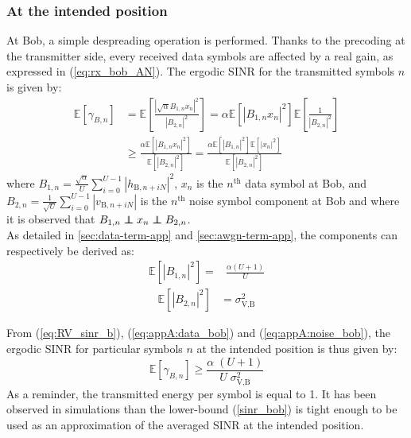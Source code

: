 \documentclass[journal,comsoc]{IEEEtran}
\newcommand{\EX}[1]{\mathbb{E} \left[#1\right]}%
\newcommand\independent{\protect\mathpalette{\protect\independenT}{\perp}}
\def\independenT#1#2{\mathrel{\rlap{$#1#2$}\mkern2mu{#1#2}}}
\begin{document}
\subsubsection{At the intended position}
At Bob, a simple despreading operation is performed. Thanks to the precoding at the transmitter side, every received data symbols are affected by a real gain, as expressed in (\ref{eq:rx_bob_AN}). The ergodic SINR for the transmitted symbols $n$ is given by:
\begin{equation}
\begin{split}
\EX{\gamma_{B,n}} &= \EX{ \frac{  \left| \sqrt{\alpha} B_{1,n} x_n \right|^2  }{  \left| B_{2,n} \right|^2} }  = \alpha \EX{\left| B_{1,n}  x_n\right|^2}  \EX{\frac{1}{\left| B_{2,n} \right|^2}}  \\
& \geq  \frac{\alpha \EX{  \left| B_{1,n}  x_n\right|^2 } }{\EX{ \left| B_{2,n} \right|^2 }} =  \frac{\alpha \EX{ \left|B_{1,n}  \right|^2 } \EX{ \left| x_n \right|^2 } }{\EX{ \left| B_{2,n} \right|^2 }}
\label{eq:RV_sinr_b}
\end{split}
\end{equation}
where $B_{1,n} = \frac{\sqrt{\alpha}}{U}\sum_{i=0}^{U-1} \left| h_{\text{B}, n + iN}\right|^2$, $x_n$ is the $n^{\text{th}}$ data symbol at Bob, and $B_{2,n} = \frac{1}{\sqrt{U}}\sum_{i=0}^{U-1} \left| v_{\text{B}, n + iN}\right|$ is the $n^{\text{th}}$ noise symbol component at Bob and where it is observed that $B_{1,n} \independent x_n \independent B_{2,n}$.\\
As detailed in \ref{sec:data-term-app} and \ref{sec:awgn-term-app}, the components can respectively be derived as:
\begin{equation}
	\begin{split}
	\EX{|B_{1,n}|^2} =& \frac{\alpha (U+1)}{U}
	\end{split}
	\label{eq:appA:data_bob}
\end{equation}
\begin{equation}
	\begin{split}
	\EX{|B_{2,n}|^2} &= \sigma^2_{\text{V,B}}
	\end{split}
	\label{eq:appA:noise_bob}
\end{equation}

From (\ref{eq:RV_sinr_b}), (\ref{eq:appA:data_bob}) and (\ref{eq:appA:noise_bob}), the ergodic SINR for particular symbols $n$ at the intended position is thus given by:
\begin{equation}
\EX{\gamma_{B,n}} \geq \frac{\alpha \;(U+1)}{U \; \sigma_{\text{V,B}}^2}
\label{sinr_bob}
\end{equation}
As a reminder, the transmitted energy per symbol is equal to 1. It has been observed in simulations than the lower-bound (\ref{sinr_bob}) is tight enough to be used as an approximation of the averaged SINR at the intended position. 
\end{document}
